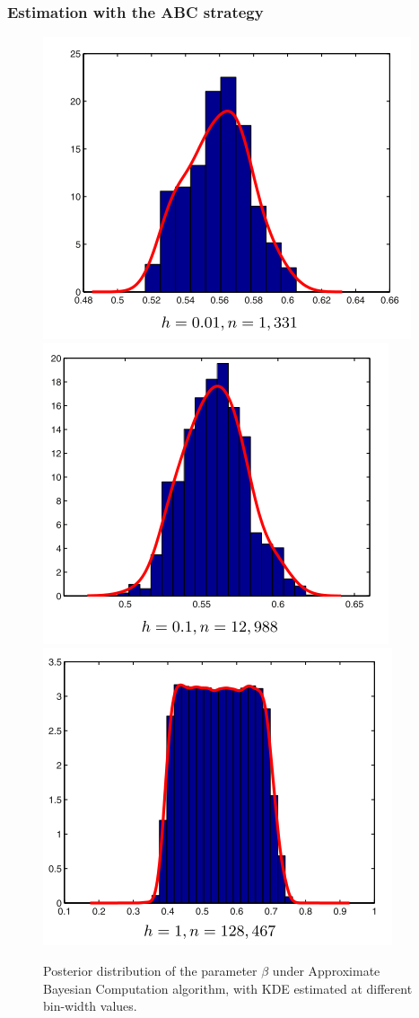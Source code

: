 \documentclass[10pt]{beamer}
\begin{document}
\begin{frame}[c]\frametitle{Estimation with the ABC strategy}
	\begin{figure} \centering
		\includegraphics[scale=.26]{figures/grazzini_2017_abc1.png} ~
		\includegraphics[scale=.26]{figures/grazzini_2017_abc2.png} ~
		\includegraphics[scale=.26]{figures/grazzini_2017_abc3.png}
		\caption{Posterior distribution of the parameter $\beta$ under Approximate Bayesian Computation algorithm, with KDE estimated at different bin-width values.}
	\end{figure} \vspace*{-.5cm}


\end{frame}
\end{document}
